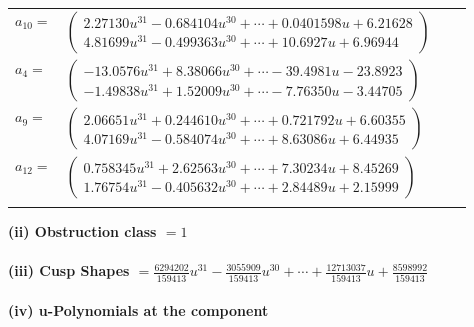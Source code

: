 \documentclass[1p]{elsarticle_modified}
\theoremstyle{definition}
\begin{document}
\begin{tabular}{m{7pt} m{180pt} m{7pt} m{180pt} }
\flushright $a_{10}=$&$\begin{pmatrix}2.27130 u^{31}-0.684104 u^{30}+\cdots+0.0401598 u+6.21628\\4.81699 u^{31}-0.499363 u^{30}+\cdots+10.6927 u+6.96944\end{pmatrix}$ \\
\flushright $a_{4}=$&$\begin{pmatrix}-13.0576 u^{31}+8.38066 u^{30}+\cdots-39.4981 u-23.8923\\-1.49838 u^{31}+1.52009 u^{30}+\cdots-7.76350 u-3.44705\end{pmatrix}$ \\
\flushright $a_{9}=$&$\begin{pmatrix}2.06651 u^{31}+0.244610 u^{30}+\cdots+0.721792 u+6.60355\\4.07169 u^{31}-0.584074 u^{30}+\cdots+8.63086 u+6.44935\end{pmatrix}$ \\
\flushright $a_{12}=$&$\begin{pmatrix}0.758345 u^{31}+2.62563 u^{30}+\cdots+7.30234 u+8.45269\\1.76754 u^{31}-0.405632 u^{30}+\cdots+2.84489 u+2.15999\end{pmatrix}$\\&\end{tabular}
\flushleft \textbf{(ii) Obstruction class $= 1$}\\~\\
\flushleft \textbf{(iii) Cusp Shapes $= \frac{6294202}{159413} u^{31}-\frac{3055909}{159413} u^{30}+\cdots+\frac{12713037}{159413} u+\frac{8598992}{159413}$}\\~\\
\newpage\renewcommand{\arraystretch}{1}
\flushleft \textbf{(iv) u-Polynomials at the component}\newline \\
\end{document}
